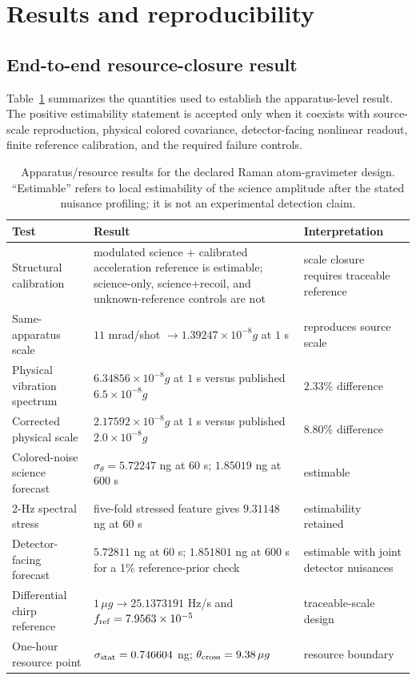 \section{Results and reproducibility}
\label{sec:results}

\subsection{End-to-end resource-closure result}

Table~\ref{tab:results} summarizes the quantities used to establish the apparatus-level result. The positive estimability statement is accepted only when it coexists with source-scale reproduction, physical colored covariance, detector-facing nonlinear readout, finite reference calibration, and the required failure controls.

\begin{table}[t]
\caption{Apparatus/resource results for the declared Raman atom-gravimeter design. ``Estimable'' refers to local estimability of the science amplitude after the stated nuisance profiling; it is not an experimental detection claim.}
\label{tab:results}
\begin{tabular}{p{}p{}p{}}
\toprule
Test & Result & Interpretation\\
\midrule
Structural calibration & modulated science + calibrated acceleration reference is estimable; science-only, science+recoil, and unknown-reference controls are not & scale closure requires traceable reference\\
Same-apparatus scale & $11$ mrad/shot $\rightarrow1.39247\times10^{-8}g$ at $1$ s & reproduces source scale\\
Physical vibration spectrum & $6.34856\times10^{-8}g$ at $1$ s versus published $6.5\times10^{-8}g$ & $2.33\%$ difference\\
Corrected physical scale & $2.17592\times10^{-8}g$ at $1$ s versus published $2.0\times10^{-8}g$ & $8.80\%$ difference\\
Colored-noise science forecast & $\sigma_\theta=5.72247$ ng at $60$ s; $1.85019$ ng at $600$ s & estimable\\
2-Hz spectral stress & five-fold stressed feature gives $9.31148$ ng at $60$ s & estimability retained\\
Detector-facing forecast & $5.72811$ ng at $60$ s; $1.851801$ ng at $600$ s for a 1\% reference-prior check & estimable with joint detector nuisances\\
Differential chirp reference & $1\,\mu g\rightarrow25.1373191$ Hz/s and $f_{\rm ref}=7.9563\times10^{-5}$ & traceable-scale design\\
One-hour resource point & $\sigma_{\rm stat}=0.746604$ ng; $\theta_{\rm cross}=9.38\,\mu g$ & resource boundary\\
\bottomrule
\end{tabular}
\end{table}

